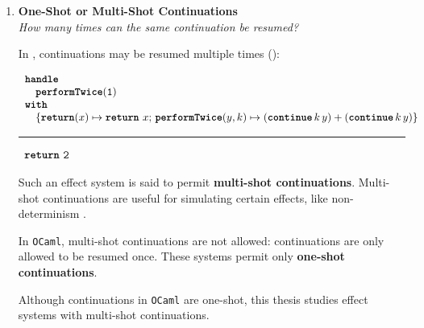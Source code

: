 \begin{enumerate}
        \item \textbf{\textsf{One-Shot or Multi-Shot Continuations}}\\
        \textit{How many times can the same continuation be resumed?}
 
        In \efflang{}, continuations may be resumed multiple times ():

        \begin{minipage}[t]{\linewidth}
          
        \begin{efflst}
          $\begin{array}{l}
            \textbf{\texttt{handle}} \\
            \quad \textbf{\texttt{performTwice}}(\texttt{1}) \\
            \textbf{\texttt{with}} \\
            \quad \{ \textbf{\texttt{return}}(x) \mapsto {\texttt{\textbf{return}} \,\, {x}};  \, \textbf{\texttt{performTwice}}(y, k) \mapsto (\textbf{\texttt{continue}} \, {k} \, {y}) + (\textbf{\texttt{continue}} \, {k} \, {y}) \}\\
          \end{array}$
          \vspace{2mm} 
          \textcolor{effComment}{\hrule height 0.2mm \relax}
          \vspace{2mm} 
          
          \textcolor{effComment}{$\begin{array}{l}\texttt{\textbf{return}} \,\, {\texttt{2}}\end{array}$}
        \end{efflst}
        \label{listing:eff-multishot}
      \end{minipage}
      \par\vspace{0.6\baselineskip}
        Such an effect system is said to permit \textbf{multi-shot continuations}. Multi-shot continuations are useful for simulating certain effects, like non-determinism \citep{phipps-costin-2023}. 

        In \texttt{OCaml}, multi-shot continuations are not allowed: continuations are only allowed to be resumed once. These systems permit only \textbf{one-shot continuations}. 

        Although continuations in \texttt{OCaml} are one-shot, this thesis studies effect systems with multi-shot continuations.
\end{enumerate}
